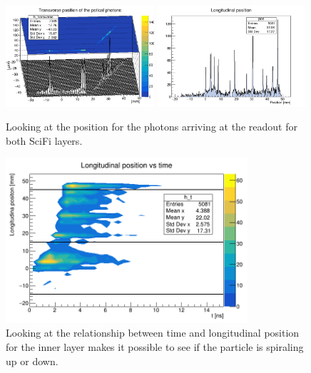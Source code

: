 \begin{refsection}
        \begin{figure}
            \centering
            \includegraphics[width=0.49\textwidth]{Figures/muEDM/Tracker/fPosInXfPosInZ.png}
            \includegraphics[width=0.49\textwidth]{Figures/muEDM/Tracker/fPosInY.png}
            \caption[muEDM tracker \gf: transverse and longitudinal information]{Looking at the position for the photons arriving at the readout for both SciFi layers.}
        \label{fig:geant4_position}
        \end{figure}
    
        \begin{figure}
            \centering
            \includegraphics[width=0.8\textwidth]{Figures/muEDM/Tracker/fPosInYfTimeIn.png}
            \caption[muEDM tracker \gf: time and logitudinal position]{Looking at the relationship between time and longitudinal position for the inner layer makes it possible to see if the particle is spiraling up or down.}
        \label{fig:geant4_time_pos}
        \end{figure}


\end{refsection}

